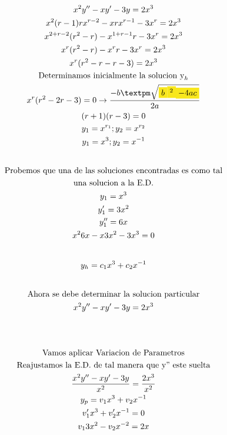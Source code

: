 \documentclass{article}
\begin{document}
\begin{gather*}
x^{2}y''-xy'-3y = 2x^{3} \\
x^{2} (r-1)rx^{r-2}  -xrx^{r-1}-3x^{r} = 2x^{3} \\
x^{2+r-2}(r^{2}-r)-x^{1+r-1}r-3x^{r} = 2x^{3} \\
x^{r}(r^{2}-r)-x^{r}r-3x^{r} =  2x^{3} \\
x^{r} (r^{2}-r-r-3) =2x^{3} \\
\text{Determinamos inicialmente la solucion y}_{h} \\
x^{r} (r^{2}-2r-3) =0   \rightarrow   \frac{-b±\sqrt{\text{\colorbox[RGB]{248,231,28}{$b$}}\text{\colorbox[RGB]{248,231,28}{$^{2}$}}\text{\colorbox[RGB]{248,231,28}{$-4ac$}}}}{2a} \\
(r+1)(r-3) = 0 \\
y_{1} = x^{r_{1}}   ; y_{2} = x^{r_{2}} \\
y_{1} = x^{3}; y_{2} = x^{-1} \\
\vspace{0.5em} \\
\text{Probemos que una de las soluciones encontradas es como tal} \\
\text{una solucion a la E.D.} \\
y_{1} = x^{3} \\
y_{1}' = 3x^{2} \\
y_{1}'' = 6x \\
x^{2}6x-x3x^{2}-3x^{3} = 0 \\
\vspace{0.5em} \\
y_{h} = c_{1}x^{3}+c_{2} x^{-1} \\
\vspace{0.5em} \\
\text{Ahora se debe determinar la solucion particular} \\
x^{2}y''-xy'-3y = 2x^{3} \\
\vspace{0.5em} \\
\vspace{0.5em} \\
\text{Vamos aplicar Variacion de Parametros} \\
\text{Reajustamos la E.D. de tal manera que y'' este suelta} \\
\frac{x^{2}y''-xy'-3y}{x^{2}} = \frac{2x^{3}}{x^{2}} \\
y_{p} = v_{1}x^{3} +v_{2}x^{-1} \\
v_{1}'x^{3} + v_{2}'x^{-1}  = 0 \\
v_{1}3x^{2} -v_{2}x^{-2}  = 2x \\

\end{gather*}
\end{document}
